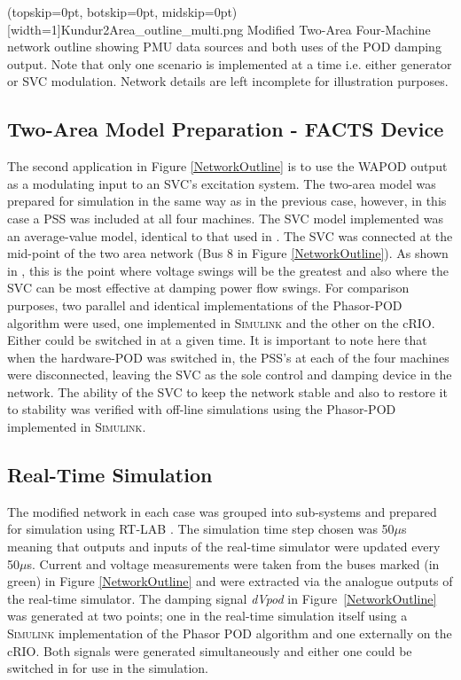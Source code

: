 \documentclass{ieeeaccess}
\begin{document}
\Figure[tbp!](topskip=0pt, botskip=0pt, midskip=0pt)[width=1\textwidth]{Kundur2Area_outline_multi.png}
{Modified Two-Area Four-Machine network outline showing PMU data sources and both uses of the POD damping output. Note that only one scenario is implemented at a time i.e. either generator or SVC modulation. Network details are left incomplete for illustration purposes.\label{NetworkOutline}}

\subsection{Two-Area Model Preparation - FACTS Device}

The second application in Figure \ref{NetworkOutline} is to use the WAPOD output as a modulating input to an SVC's excitation system. The two-area model was prepared for simulation in the same way as in the previous case, however, in this case a PSS was included at all four machines. The SVC model implemented was an average-value model, identical to that used in \cite{PhasorPODImplement}. The SVC was connected at the mid-point of the two area network (Bus 8 in Figure \ref{NetworkOutline}). As shown in \cite{sVARdamp}, this is the point where voltage swings will be the greatest and also where the SVC can be most effective at damping power flow swings. For comparison purposes, two parallel and identical implementations of the Phasor-POD algorithm were used, one implemented in \textsc{Simulink} and the other on the cRIO. Either could be switched in at a given time. It is important to note here that when the hardware-POD was switched in, the PSS's at each of the four machines were disconnected, leaving the SVC as the sole control and damping device in the network. The ability of the SVC to keep the network stable and also to restore it to stability was verified with off-line simulations using the Phasor-POD implemented in \textsc{Simulink}.

\subsection{Real-Time Simulation}
The modified network in each case was grouped into sub-systems and prepared for simulation using RT-LAB \cite{eMEGASIM}. The simulation time step chosen was 50$\mu$s meaning that outputs and inputs of the real-time simulator were updated every 50$\mu$s. Current and voltage measurements were taken from the buses marked (in green) in Figure \ref{NetworkOutline} and were extracted via the analogue outputs of the real-time simulator. The damping signal \emph{dVpod} in Figure~\ref{NetworkOutline} was generated at two points; one in the real-time simulation itself using a \textsc{Simulink} implementation of the Phasor POD algorithm and one externally on the cRIO. Both signals were generated simultaneously and either one could be switched in for use in the simulation.
\end{document}
